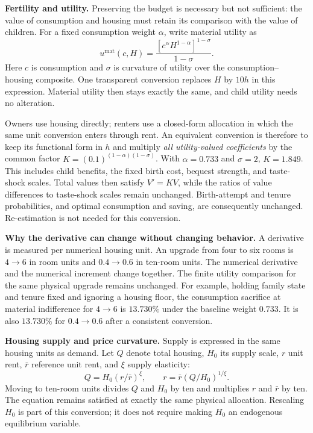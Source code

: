 \documentclass[11pt,letterpaper]{article}
\begin{document}
\textbf{Fertility and utility.} Preserving the budget is necessary but not
sufficient: the value of consumption and housing must retain its comparison
with the value of children. For a fixed consumption weight $\alpha$, write
material utility as
\[
 u^{\mathrm{mat}}(c,H)
 =\frac{[c^\alpha H^{1-\alpha}]^{1-\sigma}}{1-\sigma}.
\]
Here $c$ is consumption and $\sigma$ is curvature of utility over the consumption--
housing composite. One transparent conversion replaces $H$ by $10h$ in this
expression. Material utility then stays exactly the same, and child utility
needs no alteration.

Owners use housing directly; renters use a closed-form allocation in which
the same unit conversion enters through rent.
An equivalent conversion is therefore to keep its functional form in $h$ and
multiply \emph{all utility-valued coefficients} by the common factor
$K=(0.1)^{(1-\alpha)(1-\sigma)}$. With $\alpha=0.733$ and $\sigma=2$,
$K=1.849$. This includes child benefits, the fixed birth cost, bequest strength,
and taste-shock scales. Total values then satisfy $V'=KV$, while the ratios of
value differences to taste-shock scales remain unchanged. Birth-attempt and
tenure probabilities, and optimal consumption and saving, are consequently
unchanged. Re-estimation is not needed for this conversion.

\newpage
\begingroup
\setlength{\parskip}{4pt}
\textbf{Why the derivative can change without changing behavior.} A derivative
is measured per numerical housing unit. An upgrade from four to six rooms is
$4\to6$ in room units and $0.4\to0.6$ in ten-room units. The numerical derivative
and the numerical increment change together. The finite utility comparison
for the same physical upgrade remains unchanged. For example, holding family
state and tenure fixed and ignoring a housing floor, the consumption sacrifice
at material indifference for $4\to6$ is $13.730\%$ under the baseline weight
$0.733$. It is also $13.730\%$ for $0.4\to0.6$ after a consistent conversion.

\textbf{Housing supply and price curvature.} Supply is expressed in the same
housing units as demand. Let $Q$ denote total housing, $H_0$ its supply scale,
$r$ unit rent, $\bar r$ reference unit rent, and $\xi$ supply elasticity:
\[
 Q=H_0(r/\bar r)^\xi,
 \qquad r=\bar r(Q/H_0)^{1/\xi}.
\]
Moving to ten-room units divides $Q$ and $H_0$ by ten and multiplies $r$ and
$\bar r$ by ten. The equation remains satisfied at exactly the same physical
allocation. Rescaling $H_0$ is part of this conversion; it does not require
making $H_0$ an endogenous equilibrium variable.
\end{document}
